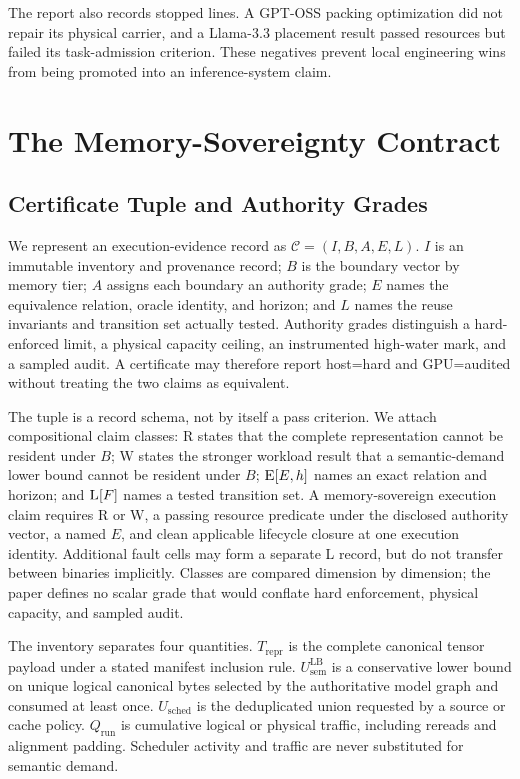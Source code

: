 \documentclass[letterpaper,twocolumn,10pt]{article}
\begin{document}
The report also records stopped lines.  A GPT-OSS packing optimization did not
repair its physical carrier, and a Llama-3.3 placement result passed resources
but failed its task-admission criterion.  These negatives prevent local engineering
wins from being promoted into an inference-system claim.

\section{The Memory-Sovereignty Contract}
\label{sec:contract}

\subsection{Certificate Tuple and Authority Grades}

We represent an execution-evidence record as
$\mathcal{C}=(I,B,A,E,L)$.  $I$ is an immutable inventory and provenance record;
$B$ is the boundary vector by memory tier; $A$ assigns each boundary an
authority grade; $E$ names the equivalence relation, oracle identity, and
horizon; and $L$ names the reuse invariants and transition set actually tested.
Authority grades distinguish a hard-enforced limit, a physical capacity
ceiling, an instrumented high-water mark, and a sampled audit.  A certificate
may therefore report host=hard and GPU=audited without treating the two claims
as equivalent.

The tuple is a record schema, not by itself a pass criterion.  We attach
compositional claim classes: \textsc{R} states that the complete
representation cannot be resident under $B$; \textsc{W} states the stronger
workload result that a semantic-demand lower bound cannot be resident under
$B$; $\textsc{E}[E,h]$ names an exact relation and horizon; and
$\textsc{L}[F]$ names a tested transition set.  A memory-sovereign execution
claim requires \textsc{R} or \textsc{W}, a passing resource predicate
under the disclosed authority vector, a named $E$, and clean applicable
lifecycle closure at one execution identity.  Additional fault cells may form a
separate \textsc{L} record, but do not transfer between binaries implicitly.
Classes are compared dimension by dimension; the paper defines no scalar grade
that would conflate hard enforcement, physical capacity, and sampled audit.

The inventory separates four quantities.  $T_{\mathrm{repr}}$ is the complete
canonical tensor payload under a stated manifest inclusion rule.
$U_{\mathrm{sem}}^{\mathrm{LB}}$ is a conservative lower bound on unique logical
canonical bytes selected by the authoritative model graph and consumed at least
once.  $U_{\mathrm{sched}}$ is the deduplicated union requested by a source or
cache policy.  $Q_{\mathrm{run}}$ is cumulative logical or physical traffic,
including rereads and alignment padding.  Scheduler activity and traffic are
never substituted for semantic demand.
\end{document}
